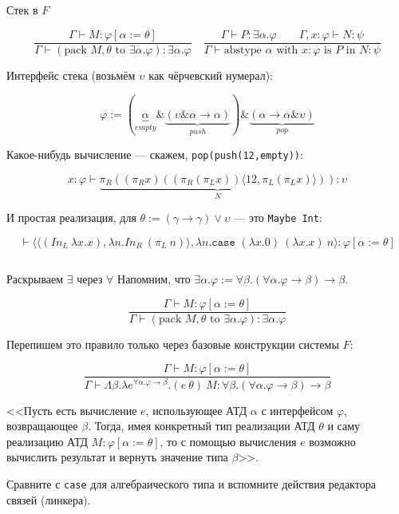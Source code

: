 \documentclass[aspectratio=169]{beamer}
\begin{document}
\begin{frame}[fragile]{Стек в $F$}

	$$\dfrac{\Gamma \vdash M : \varphi[\alpha := \theta]}{\Gamma\vdash (\text{pack } M, \theta \text{ to } \exists \alpha . \varphi) : \exists \alpha.\varphi}\quad
	\dfrac{\Gamma \vdash P : \exists \alpha . \varphi\qquad\Gamma, x : \varphi \vdash N : \psi}{\Gamma \vdash \text{abstype } \alpha \text{ with } x:\varphi \text{ is } P \text{ in } N:\psi}$$

	Интерфейс стека (возьмём $\upsilon$ как чёрчевский нумерал):

	$$\varphi := (\underbrace{\alpha}_{empty}\&\underbrace{(\upsilon\&\alpha\rightarrow\alpha)}_{push})\&\underbrace{(\alpha\rightarrow\alpha\&\upsilon)}_{pop}$$

	Какое-нибудь вычисление --- скажем, \verb!pop(push(12,empty))!:

	$$x : \varphi\vdash \underbrace{\pi_R \left((\pi_R x) ((\pi_R (\pi_L x)) \langle 12, \pi_L (\pi_L x)\rangle)\right)}_{N}:\upsilon$$

	И простая реализация, для $\theta := (\gamma\rightarrow\gamma)\vee\upsilon$ --- это \verb!Maybe Int!:

	$$\vdash \langle \langle (In_L\ \lambda x.x), \lambda n.In_R\ (\pi_L\ n)\rangle, \lambda n.\texttt{case }(\lambda x.0)\ (\lambda x.x)\ n\rangle : \varphi[\alpha := \theta]$$

	$ $


\end{frame}

\begin{frame}{Раскрываем $\exists$ через $\forall$}
Напомним, что $\exists\alpha.\varphi := \forall \beta.(\forall\alpha.\varphi\rightarrow\beta)\rightarrow \beta$.

	$$\dfrac{\Gamma \vdash M : \varphi[\alpha := \theta]}{\Gamma\vdash (\text{pack } M, \theta \text{ to } \exists \alpha . \varphi) : \exists \alpha.\varphi}$$

Перепишем это правило только через базовые конструкции системы $F$:

$$\dfrac{\Gamma\vdash M : \varphi[\alpha:=\theta]}{\Gamma\vdash\Lambda \beta.\lambda e^{\forall \alpha.\varphi\rightarrow\beta}.(e\ \theta)\ M : \forall \beta.(\forall \alpha.\varphi\rightarrow\beta)\rightarrow \beta}$$

<<Пусть есть вычисление $e$, использующее АТД $\alpha$ с интерфейсом $\varphi$, возвращающее $\beta$. 
Тогда, имея конкретный тип реализации АТД $\theta$ и саму реализацию АТД $M : \varphi[\alpha:=\theta]$,
то с помощью вычисления $e$ возможно вычислить результат и вернуть значение типа $\beta$>>. 

Сравните с \texttt{case} для алгебраического типа и вспомните действия редактора связей (линкера).

\end{frame}
\end{document}

